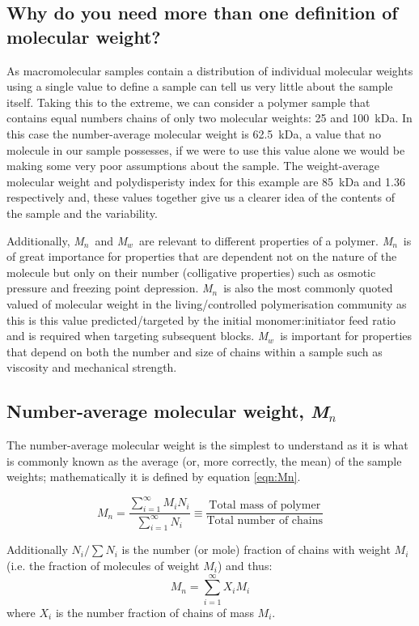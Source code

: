 \documentclass[11pt]{article}
\newcommand{\Mn}{\emph{M}$_n$}
\newcommand{\Mw}{\emph{M}$_w$}
\begin{document}
\subsection{Why do you need more than one definition of molecular weight?}
As macromolecular samples contain a distribution of individual molecular weights using a single value to define a sample can tell us very little about the sample itself.
Taking this to the extreme, we can consider a polymer sample that contains equal numbers chains of only two molecular weights: 25 and 100~kDa.
In this case the number-average molecular weight is 62.5~kDa, a value that no molecule in our sample possesses, if we were to use this value alone we would be making some very poor assumptions about the sample.
The weight-average molecular weight and polydisperisty index for this example are 85~kDa and 1.36 respectively and, these values together give us a clearer idea of the contents of the sample and the variability.

Additionally, \Mn\ and \Mw\ are relevant to different properties of a polymer.
\Mn\ is of great importance for properties that are dependent not on the nature of the molecule but only on their number (colligative properties) such as osmotic pressure and freezing point depression.
\Mn\ is also the most commonly quoted valued of molecular weight in the living/controlled polymerisation community as this is this value predicted/targeted by the initial monomer:initiator feed ratio and is required when targeting subsequent blocks.
\Mw\ is important for properties that depend on both the number and size of chains within a sample such as viscosity and mechanical strength. 

\subsection{Number-average molecular weight, \Mn}
The number-average molecular weight is the simplest to understand  as it is what is commonly known as the average (or, more correctly, the mean) of the sample weights; mathematically it is defined by equation \ref{eqn:Mn}. 

\begin{equation}
\label{eqn:Mn}
M_n  =  \frac{\displaystyle{
\sum_{i=1}^\infty{M_i N_i}}}{\displaystyle{\sum_{i=1}^\infty{N_i}}} \equiv \frac{\textrm{Total mass of polymer}}{\textrm{Total number of chains}}
\end{equation}

Additionally $N_i/\sum{N_i}$ is the number (or mole) fraction of chains with weight $M_i$ (i.e. the fraction of molecules of weight $M_i$) and thus:
\begin{equation}
\label{eqn:Mn2}
M_n = \displaystyle{
\sum_{i=1}^\infty{X_i M_i}}
\end{equation}
where ${X}_i$ is the number fraction of chains of mass $M_i$.
\end{document}
